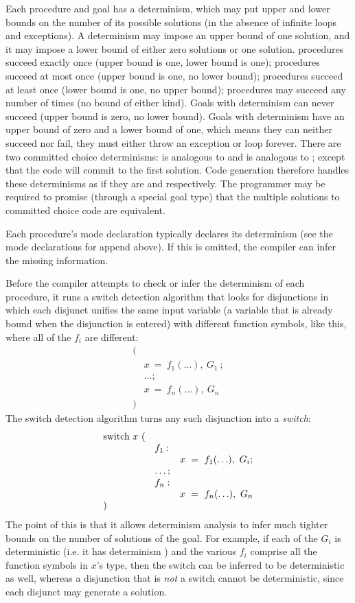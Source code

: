 \noindent
Each procedure and goal has a determinism,
which may put upper and lower bounds on the number of its possible solutions
(in the absence of infinite loops and exceptions).
A determinism may impose an upper bound of one solution,
and it may impose a lower bound of either zero solutions or one solution.
\ddet procedures succeed exactly once
(upper bound is one, lower bound is one);
\dsemidet procedures succeed at most once
(upper bound is one, no lower bound);
\dmulti procedures succeed at least once
(lower bound is one, no upper bound);
\dnondet procedures may succeed any number of times
(no bound of either kind).
Goals with determinism \dfailure can never succeed
(upper bound is zero, no lower bound).
Goals with determinism \derroneous
have an upper bound of zero and a lower bound of one,
which means they can neither succeed nor fail,
they must either throw an exception or loop forever.
There are two committed choice determinisms:
\dccmulti is analogous to \dmulti and
\dccnondet is analogous to \dnondet;
except that the code will commit to the first solution.
Code generation therefore handles these determinisms as if they are
\ddet and \dsemidet respectively.
The programmer may be required to promise
(through a special goal type)
that the multiple solutions to committed choice code are equivalent.

Each procedure's mode declaration
typically declares its determinism (see the mode declarations for append above).
If this is omitted, the compiler can infer the missing information.

Before the compiler attempts to check or infer
the determinism of each procedure,
it runs a switch detection algorithm that looks for disjunctions
in which each disjunct unifies the same input variable
(a variable that is already bound when the disjunction is entered)
with different function symbols, like this,
where all of the $f_i$ are different:
$$
\begin{array}{ll}
(\\
& x~=~f_1(\ldots),~G_1~; \\
& \ldots; \\
& x~=~f_n(\ldots),~G_n~ \\
)
\end{array}
$$
The switch detection algorithm
turns any such disjunction into a \emph{switch}:
$$
\begin{array}{lll}
\hbox{switch}~x~( \\
& f_1: \\
& & x~=~f_1(\ldots),~G_i; \\
& \ldots; \\
& f_n: \\
& & x~=~f_n(\ldots),~G_n \\
)
\end{array}
$$
The point of this is that it allows determinism analysis
to infer much tighter bounds on the number of solutions of the goal.
For example, if each of the $G_i$ is deterministic
(i.e. it has determinism )
and the various $f_i$ comprise all the function symbols in $x$'s type,
then the switch can be inferred to be deterministic as well,
whereas a disjunction that is \emph{not} a switch cannot be deterministic,
since each disjunct may generate a solution.


